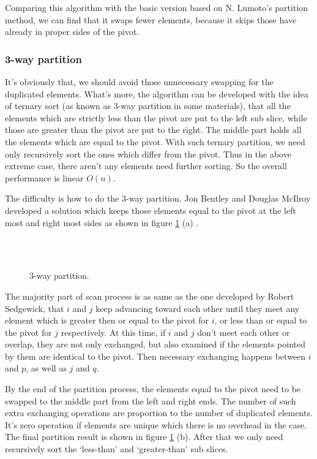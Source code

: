 \documentclass[UTF8]{article}
\begin{document}
Comparing this algorithm with the basic version based on N. Lumoto's partition method, we can find
that it swaps fewer elements, because it skips those have already in proper sides of the pivot.

\subsubsection{3-way partition}
It's obviously that, we should avoid those unnecessary swapping for the duplicated elements. What's more,
the algorithm can be developed with the idea of ternary sort (as known as 3-way partition in some
materials), that all the elements which are strictly less than the pivot are put to the left sub slice,
while those are greater than the pivot are put to the right. The middle part holds all the elements
which are equal to the pivot. With such ternary partition, we need only recursively sort the ones
which differ from the pivot. Thus in the above extreme case, there aren't any elements need further
sorting. So the overall performance is linear $O(n)$.

The difficulty is how to do the 3-way partition. Jon Bentley and Douglas McIlroy developed a solution
which keeps those elements equal to the pivot at the left most and right most sides as shown in
figure \ref{fig:partition-3-way} (a) \cite{3-way-part} \cite{opt-qs}.

\begin{figure}[htbp]
   \centering
    \\
    \\
   \caption{3-way partition.}
   \label{fig:partition-3-way}
\end{figure}

The majority part of scan process is as same as the one developed by Robert Sedgewick, that
$i$ and $j$ keep advancing toward each other until they meet any element which is greater then or equal
to the pivot for $i$, or less than or equal to the pivot for $j$ respectively.
At this time, if $i$ and $j$ don't meet each other or overlap, they are not only
exchanged, but also examined if the elements pointed by them are identical to the pivot.
Then necessary exchanging happens between $i$ and $p$, as well as $j$ and $q$.

By the end of the partition process, the elements equal to the pivot need to be swapped to the middle
part from the left and right ends. The number of such extra exchanging operations are proportion to the
number of duplicated elements. It's zero operation if elements are unique which there is no overhead
in the case. The final partition result is shown in figure \ref{fig:partition-3-way} (b). After that
we only need recursively sort the `less-than' and `greater-than' sub slices.
\end{document}
